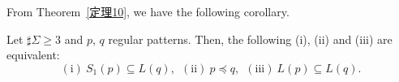 


From Theorem~\ref{定理10}, we have the following corollary.
\begin{col}
    Let $\sharp\Sigma \geq 3$ and $p$, $q$ regular patterns.
    Then, the following (i), (ii) and (iii) are equivalent:
    \[
        (\mathrm{i})\ S_{1}(p) \subseteq L(q),\ \
        (\mathrm{ii})\ p \preceq q,\ \
        (\mathrm{iii})\ L(p) \subseteq L(q).
    \]
\end{col}